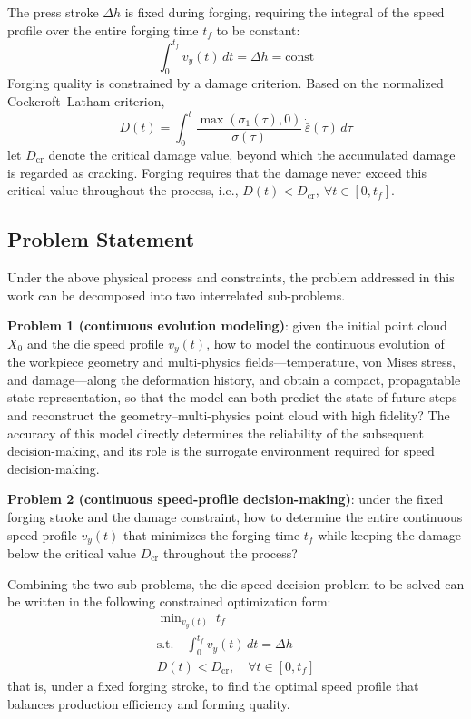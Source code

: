 The press stroke $\Delta h$ is fixed during forging, requiring the integral of the speed profile over the entire forging time $t_f$ to be constant:
\begin{equation}
\int_{0}^{t_f} v_y(t)\,dt = \Delta h = \text{const}
\end{equation}
Forging quality is constrained by a damage criterion. Based on the normalized Cockcroft--Latham criterion,
\begin{equation}
D(t) = \int_0^t \frac{\max(\sigma_1(\tau),0)}{\bar{\sigma}(\tau)}\,\dot{\bar{\varepsilon}}(\tau)\,d\tau
\end{equation}
let $D_{\text{cr}}$ denote the critical damage value, beyond which the accumulated damage is regarded as cracking. Forging requires that the damage never exceed this critical value throughout the process, i.e., $D(t) < D_{\text{cr}},\ \forall t\in[0,t_f]$.

\subsection{Problem Statement}
Under the above physical process and constraints, the problem addressed in this work can be decomposed into two interrelated sub-problems.

\textbf{Problem 1 (continuous evolution modeling)}: given the initial point cloud $X_0$ and the die speed profile $v_y(t)$, how to model the continuous evolution of the workpiece geometry and multi-physics fields---temperature, von Mises stress, and damage---along the deformation history, and obtain a compact, propagatable state representation, so that the model can both predict the state of future steps and reconstruct the geometry--multi-physics point cloud with high fidelity? The accuracy of this model directly determines the reliability of the subsequent decision-making, and its role is the surrogate environment required for speed decision-making.

\textbf{Problem 2 (continuous speed-profile decision-making)}: under the fixed forging stroke and the damage constraint, how to determine the entire continuous speed profile $v_y(t)$ that minimizes the forging time $t_f$ while keeping the damage below the critical value $D_{\text{cr}}$ throughout the process?

Combining the two sub-problems, the die-speed decision problem to be solved can be written in the following constrained optimization form:
\begin{equation}
\begin{gathered}
\min\nolimits_{v_y(t)} \; t_f \\
\text{s.t.} \quad \int_{0}^{t_f} v_y(t)\,dt = \Delta h \\
D(t) < D_{\text{cr}}, \quad \forall t \in [0, t_f]
\end{gathered}
\label{equ:model}
\end{equation}
that is, under a fixed forging stroke, to find the optimal speed profile that balances production efficiency and forming quality.
